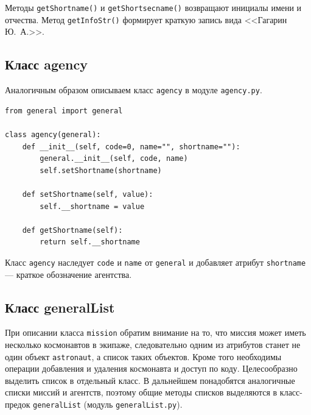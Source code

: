 \documentclass[a4paper,14pt]{extarticle}
\begin{document}
Методы \texttt{getShortname()} и \texttt{getShortsecname()} возвращают инициалы имени и отчества. Метод \texttt{getInfoStr()} формирует краткую запись вида <<Гагарин Ю.~А.>>.

\subsection{Класс agency}

Аналогичным образом описываем класс \texttt{agency} в модуле \texttt{agency.py}.

\begin{lstlisting}[caption={Модуль \texttt{agency.py}}]
from general import general

class agency(general):
    def __init__(self, code=0, name="", shortname=""):
        general.__init__(self, code, name)
        self.setShortname(shortname)

    def setShortname(self, value):
        self.__shortname = value

    def getShortname(self):
        return self.__shortname
\end{lstlisting}

Класс \texttt{agency} наследует \texttt{code} и \texttt{name} от \texttt{general} и добавляет атрибут \texttt{shortname} --- краткое обозначение агентства.

\subsection{Класс generalList}

При описании класса \texttt{mission} обратим внимание на то, что миссия может иметь несколько космонавтов в экипаже, следовательно одним из атрибутов станет не один объект \texttt{astronaut}, а список таких объектов. Кроме того необходимы операции добавления и удаления космонавта и доступ по коду. Целесообразно выделить список в отдельный класс. В дальнейшем понадобятся аналогичные списки миссий и агентств, поэтому общие методы списков выделяются в класс-предок \texttt{generalList} (модуль \texttt{generalList.py}).
\end{document}
